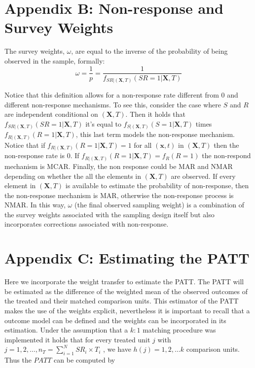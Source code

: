 \documentclass[oupdraft]{bio}
\begin{document}
\section*{Appendix B: Non-response and Survey Weights}

The survey weights, $\omega$, are equal to the inverse of the probability of being observed in the sample,
formally:
\begin{equation}
\omega=\frac{1}{p}=\frac{1}{f_{SR|(\mathbf{X},T)}\left(SR=1|\mathbf{X},T\right)}\label{eq:WEIG}
\end{equation}

Notice that this definition allows for a non-response rate different from 0 and different non-response mechanisms. To see this, consider the case where $S$ and  $R$ are independent conditional on $(\mathbf{X},T)$. Then it holds that $f_{SR|(\mathbf{X},T)}\left(SR=1|\mathbf{X},T\right)$ it's equal to $f_{S|(\mathbf{X},T)}\left(S=1|\mathbf{X},T\right)$ times $f_{R|(\mathbf{X},T)}\left(R=1|\mathbf{X},T\right) $, this last term models the non-response mechanism. Notice that if $f_{R|(\mathbf{X},T)}\left(R=1|\mathbf{X},T\right) = 1$ for all $(\mathbf{x},t)$ in $(\mathbf{X},T)$ then the non-response rate is 0. If $f_{R|(\mathbf{X},T)}\left(R=1|\mathbf{X},T\right) = f_{R}\left(R=1\right)$ the non-respond mechanism is MCAR. Finally, the non response could be MAR and NMAR depending on whether the all the elements in $\left(\mathbf{X},T\right)$ are observed. If every element in $\left(\mathbf{X},T\right)$ is available to estimate the probability of non-response, then the non-response mechanism is MAR, otherwise the non-response process is NMAR. In this way, $\omega$ (the final observed sampling weight) is a combination of the survey weights associated with the sampling design itself but also incorporates corrections associated with non-response. 

\section*{Appendix C: Estimating the PATT}
\label{AA}
Here we incorporate the weight transfer to estimate the PATT. The PATT will be estimated as the difference of the weighted mean of the observed outcomes of the treated and their matched comparison units. This estimator of the PATT makes the use of the weights explicit, nevertheless it is important to recall that a outcome model can be defined and the weights can be incorporated in its estimation. Under the assumption that a $k:1$ matching procedure was implemented it holds that for every
treated unit $j$ with $j=1,2,\ldots,n_{T}=\sum_{i=1}^{N}SR_{i}\times T_{i}$
, we have $h(j)=1,2,\ldots k$ comparison units. Thus the $PATT$ can be computed
by 
\end{document}
